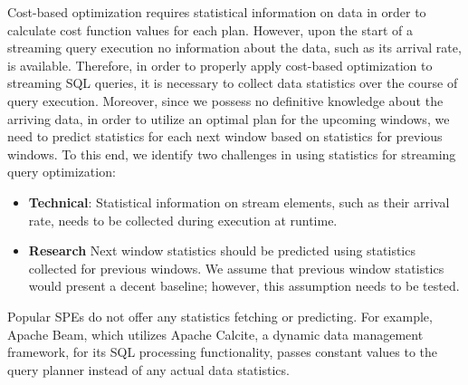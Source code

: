Cost-based optimization requires statistical information on data in order to calculate cost function values for each plan. However, upon the start of a streaming query execution no information about the data, such as its arrival rate, is available. Therefore, in order to properly apply cost-based optimization to streaming SQL queries, it is necessary to collect data statistics over the course of query execution. Moreover, since we possess no definitive knowledge about the arriving data, in order to utilize an optimal plan for the upcoming windows, we need to predict statistics for each next window based on statistics for previous windows. To this end, we identify two challenges in using statistics for streaming query optimization:

\begin{itemize}
    \item \textbf{Technical}:
    Statistical information on stream elements, such as their arrival rate, needs to be collected during execution at runtime.
    \item \textbf{Research}
    Next window statistics should be predicted using statistics collected for previous windows. We assume that previous window statistics would present a decent baseline; however, this assumption needs to be tested. 
\end{itemize}

Popular SPEs do not offer any statistics fetching or predicting. For example, Apache Beam, which utilizes Apache Calcite, a dynamic data management framework, for its SQL processing functionality, passes constant values to the query planner instead of any actual data statistics.

